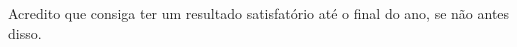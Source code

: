 \documentclass[ppgc,pep]{infufrgs}
\begin{document}
Acredito que consiga ter um resultado satisfatório até o final do ano, se não antes disso.




\end{document}
